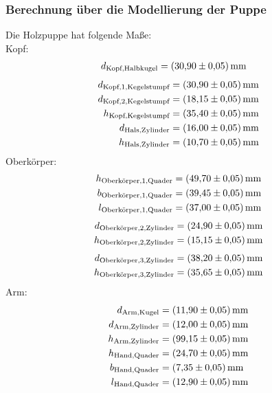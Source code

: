 \subsubsection{Berechnung über die Modellierung der Puppe}
Die Holzpuppe hat folgende Maße:\\
Kopf:\\
\begin{align*}
d_{\text{Kopf,Halbkugel}} &= (\num{30.9 +- 0.05})\,\si{\milli\meter}
\end{align*}
\begin{align*}
d_{\text{Kopf,1,Kegelstumpf}} &= (\num{30.9 +- 0.05})\,\si{\milli\meter} \\
d_{\text{Kopf,2,Kegelstumpf}} &= (\num{18.15 +- 0.05})\,\si{\milli\meter} \\
h_{\text{Kopf,Kegelstumpf}} &= (\num{35.4 +- 0.05})\,\si{\milli\meter} \\
d_{\text{Hals,Zylinder}} &= (\num{16 +- 0.05})\,\si{\milli\meter} \\
h_{\text{Hals,Zylinder}} &= (\num{10.7 +- 0.05})\,\si{\milli\meter}
\end{align*}
Oberkörper:\\
\begin{align*}
h_{\text{Oberkörper,1,Quader}} &= (\num{49.7 +- 0.05})\,\si{\milli\meter} \\
b_{\text{Oberkörper,1,Quader}} &= (\num{39.45 +- 0.05})\,\si{\milli\meter} \\
l_{\text{Oberkörper,1,Quader}} &= (\num{37 +- 0.05})\,\si{\milli\meter}
\end{align*}
\begin{align*}
d_{\text{Oberkörper,2,Zylinder}} &= (\num{24.9 +- 0.05})\,\si{\milli\meter} \\
h_{\text{Oberkörper,2,Zylinder}} &= (\num{15.15 +- 0.05})\,\si{\milli\meter}
\end{align*}
\begin{align*}
d_{\text{Oberkörper,3,Zylinder}} &= (\num{38.2 +- 0.05})\,\si{\milli\meter} \\
h_{\text{Oberkörper,3,Zylinder}} &= (\num{35.65 +- 0.05})\,\si{\milli\meter}
\end{align*}
Arm:\\
\begin{align*}
d_{\text{Arm,Kugel}} &= (\num{11.9 +- 0.05})\,\si{\milli\meter} \\
d_{\text{Arm,Zylinder}} &= (\num{12 +- 0.05})\,\si{\milli\meter} \\
h_{\text{Arm,Zylinder}} &= (\num{99.15 +- 0.05})\,\si{\milli\meter} \\
h_{\text{Hand,Quader}} &= (\num{24.7 +- 0.05})\,\si{\milli\meter} \\
b_{\text{Hand,Quader}} &= (\num{7.35 +- 0.05})\,\si{\milli\meter} \\
l_{\text{Hand,Quader}} &= (\num{12.9 +- 0.05})\,\si{\milli\meter}
\end{align*}
